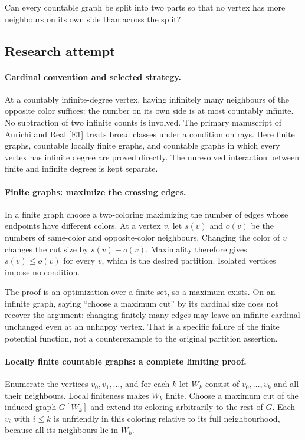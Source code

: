 \documentclass[11pt,a4paper]{article}
\begin{document}
Can every countable graph be split into two parts so that no vertex has more neighbours on its own side than across the split?

\subsection{Research attempt}

\paragraph{Cardinal convention and selected strategy.}
At a countably infinite-degree vertex, having infinitely many neighbours
of the opposite color suffices: the number on its own side is at most
countably infinite. No subtraction of two infinite counts is involved.
The primary manuscript of Aurichi and Real [E1] treats broad classes
under a condition on rays. Here finite graphs, countable locally finite
graphs, and countable graphs in which every vertex has infinite degree
are proved directly. The unresolved interaction between finite and
infinite degrees is kept separate.

\paragraph{Finite graphs: maximize the crossing edges.}
In a finite graph choose a two-coloring maximizing the number of edges
whose endpoints have different colors. At a vertex $v$, let $s(v)$
and $o(v)$ be the numbers of same-color and opposite-color neighbours.
Changing the color of $v$ changes the cut size by $s(v)-o(v)$.
Maximality therefore gives $s(v)\le o(v)$ for every $v$, which is
the desired partition. Isolated vertices impose no condition.

The proof is an optimization over a finite set, so a maximum exists.
On an infinite graph, saying ``choose a maximum cut'' by its cardinal
size does not recover the argument: changing finitely many edges may
leave an infinite cardinal unchanged even at an unhappy vertex.
That is a specific failure of the finite potential function, not a
counterexample to the original partition assertion.

\paragraph{Locally finite countable graphs: a complete limiting proof.}
Enumerate the vertices $v_0,v_1,\ldots$, and for each $k$ let
$W_k$ consist of $v_0,\ldots,v_k$ and all their neighbours. Local
finiteness makes $W_k$ finite. Choose a maximum cut of the induced
graph $G[W_k]$ and extend its coloring arbitrarily to the rest of
$G$. Each $v_i$ with $i\le k$ is unfriendly in this coloring relative
to its full neighbourhood, because all its neighbours lie in $W_k$.
\end{document}
